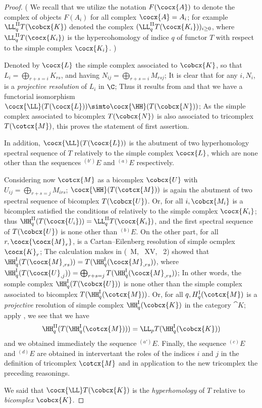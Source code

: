 \begin{proof}
(
  We recall that we utilize the notation $F(\cocx{A})$ to denote the complex of objects $F(A_i)$ for all complex $\cocx{A} = A_i$; 
  for example $\LL_q^\text{II} T(\cobcx{K})$ denoted the complex $(\LL_q^\text{II} T(\cocx{K_i}))_{i\geq 0}$, 
  where $\LL_q^\text{II} T(\cocx{K_i})$ is the hypercohomology of indice $q$ of functor $T$ with respect to the simple complex $\cocx{K_i}$.
)

Denoted by $\cocx{L}$ the simple complex associated to $\cobcx{K}$, so that $L_i = \bigoplus_{r+s=i}K_{rs}$, and having $N_{ij} = \bigoplus_{r+s=i}M_{rsj}$;
It is clear that for any $i, N_i$, is a \emph{projective resolution} of $L_i$ in $\C$;
Thus it results from  and  that we have a functorial isomorphism $\cocx{\LL}(T(\cocx{L})) \simto \cocx{\HH}(T(\cobcx{N}))$;
As the simple complex associated to bicomplex $T(\cobcx{N})$ is also associated to tricomplex $T(\cotcx{M})$, this proves the statement of first assertion.

In addition, $\cocx{\LL}(T(\cocx{L}))$ is the abutment of two hyperhomology spectral sequence  of $T$ relatively to the simple complex $\cocx{L}$, 
which are none other than the sequences $^{(b')}E$ and $^{(a)}E$ respectively.

Considering now $\cotcx{M}$ as a bicomplex $\cobcx{U}$ with $U_{ij} = \bigoplus_{r+s=j} M_{irs}$;
$\cocx{\HH}(T(\cotcx{M}))$ is again the abutment of two spectral sequence of bicomplex $T(\cobcx{U})$.
Or, for all $i, \cobcx{M_i}$ is a bicomplex satisfied the conditions of  relatively to the simple complex $\cocx{K_i}$;
thus $\HH_q^{\text{II}}(T(\cocx{U_i})) = \LL_q^{\text{II}}T(\cocx{K_i})$, and the first spectral sequence of $T(\cobcx{U})$ is none other than $^(b)E$.
On the other part, for all $r, \cocx{\cocx{M}_r}$, is a Cartan--Eilenberg resolution of simple ocmplex $\cocx{K}_r$;
The calculation makes in (~M, ~XV, ~2) showed that $\HH_q^\text{I}(T(\cocx{M}_{,rs})) = T(\HH_q^\text{I}(\cocx{M}_{,rs}))$, 
where $\HH_q^\text{I}(T(\cocx{U}_{,j})) = \bigoplus_{r+s=j} T(\HH_q^\text{I}(\cocx{M}_{,rs}))$;
In other words, the somple complex $\HH_q^\text{I}(T(\cobcx{U}))$ is none other than the simple complex associated to bicomplex $T(\HH_q^\text{I}(\cotcx{M}))$.
Or, for all $q, H_q^\text{I}(\cotcx{M})$ is a \emph{projective} resolution of simple complex $\HH_q^\text{I}(\cobcx{K})$ in the category $\cat{K}$;
apply , we see that we have
\[
  \HH_q^\text{II}(T(\HH_q^\text{I}(\cotcx{M}))) = \LL_p T(\HH_q^\text{I}(\cobcx{K}))
\]
and we obtained immediately the sequence $^(a')E$.
Finally, the sequence $^(c)E$ and $^(d)E$ are obtained in intervertant the roles of the indices $i$ and $j$ in the definition of tricomplex $\cotcx{M}$ and 
in application to the new tricomplex the preceding reasonings.

We said that $\cocx{\LL}T(\cobcx{K})$ is the \emph{hyperhomology} of $T$ relative to \emph{bicomplex} $\cobcx{K}$.
\end{proof}

